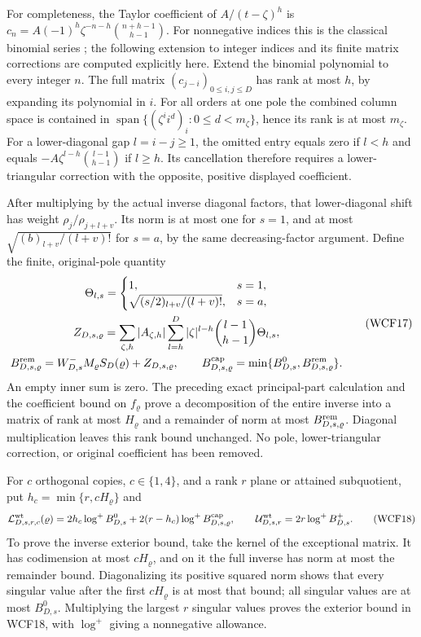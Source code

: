 \documentclass[11pt,a4paper]{article}
\begin{document}
For completeness, the Taylor coefficient of $A/(t-\zeta)^h$ is
$c_n=A(-1)^h\zeta^{-n-h}\binom{n+h-1}{h-1}$.
For nonnegative indices this is the classical binomial series
\cite[eq.~(1.10.4)]{human:dlmf1}; the following extension to integer
indices and its finite matrix corrections are computed explicitly here.
Extend the binomial polynomial to every integer $n$. The full matrix
$(c_{j-i})_{0\le i,j\le D}$ has rank at most $h$, by expanding its
polynomial in $i$. For all orders at one pole the combined column
space is contained in $\operatorname{span}\{(\zeta^ii^d)_i:
0\le d<m_\zeta\}$, hence its rank is at most $m_\zeta$.
For a lower-diagonal gap $l=i-j\ge1$, the omitted entry equals
zero if $l<h$ and equals
$-A\zeta^{l-h}\binom{l-1}{h-1}$ if $l\ge h$.
Its cancellation therefore requires a lower-triangular correction with
the opposite, positive displayed coefficient.

After multiplying by the actual inverse diagonal factors, that
lower-diagonal shift has weight $\rho_j/\rho_{j+l+v}$. Its norm is
at most one for $s=1$, and at most
$\sqrt{(b)_{l+v}/(l+v)!}$ for $s=a$, by the same decreasing-factor
argument. Define the finite, original-pole quantity
\[
\begin{gathered}
 \Theta_{l,s}=\begin{cases}1,&s=1,\\
       \sqrt{(s/2)_{l+v}/(l+v)!},&s=a,\end{cases}\\
 Z_{D,s,\varrho}=\sum_{\zeta,h}|A_{\zeta,h}|
      \sum_{l=h}^{D}|\zeta|^{l-h}\binom{l-1}{h-1}\Theta_{l,s},\\
 B^{\rm rem}_{D,s,\varrho}=W_{D,s}^-M_\varrho S_D(\varrho)
                              +Z_{D,s,\varrho},\qquad
 B^{\rm cap}_{D,s,\varrho}
     =\min\{B^0_{D,s},B^{\rm rem}_{D,s,\varrho}\}.
\end{gathered}\tag{WCF17}
\]
An empty inner sum is zero. The preceding exact principal-part
calculation and the coefficient bound on $f_\varrho$ prove a decomposition
of the entire inverse into a matrix of rank at most $H_\varrho$ and
a remainder of norm at most $B^{\rm rem}_{D,s,\varrho}$.
Diagonal multiplication leaves this rank bound unchanged. No pole,
lower-triangular correction, or original coefficient has been removed.

For $c$ orthogonal copies, $c\in\{1,4\}$, and a rank $r$ plane or
attained subquotient, put $h_c=\min\{r,cH_\varrho\}$ and
\[
 \mathcal L^{\rm wt}_{D,s,r,c}(\varrho)
 =2h_c\log^+B^0_{D,s}
       +2(r-h_c)\log^+B^{\rm cap}_{D,s,\varrho},\qquad
 \mathcal U^{\rm wt}_{D,s,r}=2r\log^+B^+_{D,s}.
 \tag{WCF18}
\]
To prove the inverse exterior bound, take the kernel of the exceptional
matrix. It has codimension at most $cH_\varrho$, and on it the full
inverse has norm at most the remainder bound. Diagonalizing its positive
squared norm shows that every singular value after the first
$cH_\varrho$ is at most that bound; all singular values are at most
$B^0_{D,s}$. Multiplying the largest $r$ singular values proves the
exterior bound in WCF18, with $\log^+$ giving a nonnegative allowance.
\end{document}
